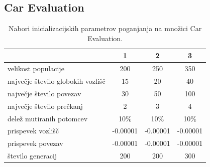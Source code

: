 \subsection{Car Evaluation}\label{subsec:car_test}
\begin{table}[H]
    \caption{Nabori inicializacijskih parametrov poganjanja na množici Car Evaluation.}
    \begin{center}
        \begin{tabular}{||l c c c||}
            \hline
            & 1        & 2        & 3 \\ [0.5ex]
            \hline
            velikost populacije               & 200      & 250      & 350      \\
            \hline
            največje število globokih vozlišč & 15       & 20       & 40       \\
            \hline
            največje število povezav          & 30       & 50       & 100      \\
            \hline
            največje število prečkanj         & 2        & 3        & 4        \\
            \hline
            delež mutiranih potomcev          & 10\%     & 10\%     & 10\%     \\
            \hline
            prispevek vozlišč                 & -0.00001 & -0.00001 & -0.00001 \\
            \hline
            prispevek povezav                 & -0.00001 & -0.00001 & -0.00001 \\
            \hline
            število generacij                 & 200      & 200      & 300      \\
            \hline
        \end{tabular}
    \end{center}
    \label{tab:param_car}
\end{table}


